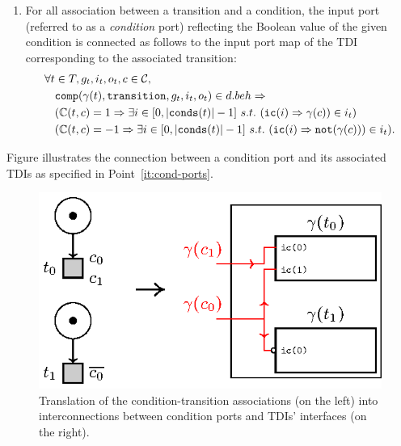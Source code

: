 \begin{definition}
  \bigskip
  
  \begin{enumerate}[resume]
  \item\label{it:cond-ports} For all association between a transition and a condition, the
    input port (referred to as a \textit{condition} port) reflecting
    the Boolean value of the given condition is connected as follows
    to the input port map of the TDI corresponding to the associated
    transition:
    \begin{equation*}
      \begin{aligned}[t]
        \forall{}t&\in{}T,g_t,i_t,o_t,c\in\mathcal{C}, \\
                  & \mathtt{comp}(\gamma(t),\mathtt{transition},g_t,i_t,o_t)\in{}d.beh\Rightarrow \\
                  & (\mathbb{C}(t,c)=1\Rightarrow\exists{}i\in[0,\vert\mathtt{conds}(t)\vert-1]~s.t.~(\mathtt{ic}(i)\Rightarrow{}\gamma(c))\in{}i_t) \\
                  & (\mathbb{C}(t,c)=-1\Rightarrow\exists{}i\in[0,\vert\mathtt{conds}(t)\vert-1]~s.t.~(\mathtt{ic}(i)\Rightarrow{}\mathtt{not}(\gamma(c)))\in{}i_t). \\
      \end{aligned}
    \end{equation*}

  \end{enumerate}

  Figure illustrates the connection between a condition port and its
  associated TDIs as specified in Point~\ref{it:cond-ports}.
  
  \begin{figure}[h]
    \centering
    \includegraphics[keepaspectratio,width=.65\textwidth]{gen-conds.eps}
    \caption{Translation of the condition-transition associations (on
      the left) into interconnections between condition ports and
      TDIs' interfaces (on the right). }
    \label{fig:gen-conds}
  \end{figure}
  
\end{definition}

